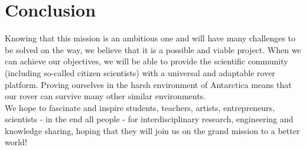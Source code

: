 \documentclass[a4paper,12pt]{article}
\begin{document}
\pagebreak

\section{Conclusion}
Knowing that this mission is an ambitious one and will have many challenges to be solved on the way, we believe that it is a possible and viable project. When we can achieve our objectives, we will be able to provide the scientific community (including so-called citizen scientists) with a universal and adaptable rover platform. Proving ourselves in the harsh environment of Antarctica means that our rover can survive many other similar environments. \\

We hope to fascinate and inspire students, teachers, artists, entrepreneurs, scientists - in the end all people - for interdisciplinary research, engineering and knowledge sharing, hoping that they will join us on the grand mission to a better world!
\end{document}
